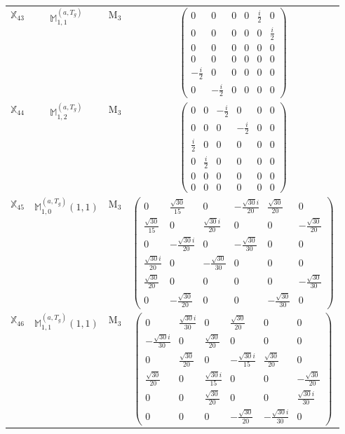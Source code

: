 \documentclass[fleqn,10pt,landscape]{article}
\begin{document}
\begin{itemize}
\begin{center}
\begin{longtable}{c|c|c|c}
$ \mathbb{X}_{43} $ & $\mathbb{M}_{1,1}^{(a,T_{g})}$ & M$_{3}$ & $\begin{pmatrix} 0 & 0 & 0 & 0 & \frac{i}{2} & 0 \\ 0 & 0 & 0 & 0 & 0 & \frac{i}{2} \\ 0 & 0 & 0 & 0 & 0 & 0 \\ 0 & 0 & 0 & 0 & 0 & 0 \\ - \frac{i}{2} & 0 & 0 & 0 & 0 & 0 \\ 0 & - \frac{i}{2} & 0 & 0 & 0 & 0 \end{pmatrix}$ \\
$ \mathbb{X}_{44} $ & $\mathbb{M}_{1,2}^{(a,T_{g})}$ & M$_{3}$ & $\begin{pmatrix} 0 & 0 & - \frac{i}{2} & 0 & 0 & 0 \\ 0 & 0 & 0 & - \frac{i}{2} & 0 & 0 \\ \frac{i}{2} & 0 & 0 & 0 & 0 & 0 \\ 0 & \frac{i}{2} & 0 & 0 & 0 & 0 \\ 0 & 0 & 0 & 0 & 0 & 0 \\ 0 & 0 & 0 & 0 & 0 & 0 \end{pmatrix}$ \\
$ \mathbb{X}_{45} $ & $\mathbb{M}_{1,0}^{(a,T_{g})}(1,1)$ & M$_{3}$ & $\begin{pmatrix} 0 & \frac{\sqrt{30}}{15} & 0 & - \frac{\sqrt{30} i}{20} & \frac{\sqrt{30}}{20} & 0 \\ \frac{\sqrt{30}}{15} & 0 & \frac{\sqrt{30} i}{20} & 0 & 0 & - \frac{\sqrt{30}}{20} \\ 0 & - \frac{\sqrt{30} i}{20} & 0 & - \frac{\sqrt{30}}{30} & 0 & 0 \\ \frac{\sqrt{30} i}{20} & 0 & - \frac{\sqrt{30}}{30} & 0 & 0 & 0 \\ \frac{\sqrt{30}}{20} & 0 & 0 & 0 & 0 & - \frac{\sqrt{30}}{30} \\ 0 & - \frac{\sqrt{30}}{20} & 0 & 0 & - \frac{\sqrt{30}}{30} & 0 \end{pmatrix}$ \\
$ \mathbb{X}_{46} $ & $\mathbb{M}_{1,1}^{(a,T_{g})}(1,1)$ & M$_{3}$ & $\begin{pmatrix} 0 & \frac{\sqrt{30} i}{30} & 0 & \frac{\sqrt{30}}{20} & 0 & 0 \\ - \frac{\sqrt{30} i}{30} & 0 & \frac{\sqrt{30}}{20} & 0 & 0 & 0 \\ 0 & \frac{\sqrt{30}}{20} & 0 & - \frac{\sqrt{30} i}{15} & \frac{\sqrt{30}}{20} & 0 \\ \frac{\sqrt{30}}{20} & 0 & \frac{\sqrt{30} i}{15} & 0 & 0 & - \frac{\sqrt{30}}{20} \\ 0 & 0 & \frac{\sqrt{30}}{20} & 0 & 0 & \frac{\sqrt{30} i}{30} \\ 0 & 0 & 0 & - \frac{\sqrt{30}}{20} & - \frac{\sqrt{30} i}{30} & 0 \end{pmatrix}$ \\

\end{longtable}
\end{center}
\end{itemize}
\end{document}
